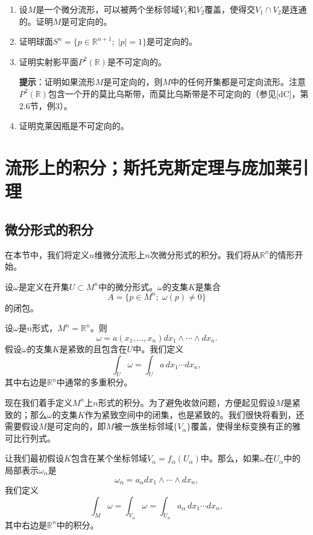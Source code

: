 \documentclass[12pt,a4paper]{ctexbook}
\begin{document}
\begin{enumerate}
    \item 设$M$是一个微分流形，可以被两个坐标邻域$V_1$和$V_2$覆盖，使得交$V_1\cap V_2$是连通的。证明$M$是可定向的。
    
    \item 证明球面$S^n = \{p\in\mathbb{R}^{n+1};\; |p|=1\}$是可定向的。
    
    \item 证明实射影平面$P^2(\mathbb{R})$是不可定向的。
    
    \textbf{提示}：证明如果流形$M$是可定向的，则$M$中的任何开集都是可定向流形。注意$P^2(\mathbb{R})$包含一个开的莫比乌斯带，而莫比乌斯带是不可定向的（参见[dC]，第2.6节，例3）。
    
    \item 证明克莱因瓶是不可定向的。
\end{enumerate}

\chapter{流形上的积分；斯托克斯定理与庞加莱引理}

\section{微分形式的积分}

在本节中，我们将定义$n$维微分流形上$n$次微分形式的积分。我们将从$\mathbb{R}^n$的情形开始。

设$\omega$是定义在开集$U\subset M^n$中的微分形式。$\omega$的支集$K$是集合
$$A = \{p\in M^n;\; \omega(p)\neq 0\}$$
的闭包。

设$\omega$是$n$形式，$M^n=\mathbb{R}^n$。则
$$\omega = a(x_1,\ldots,x_n)dx_1\wedge\cdots\wedge dx_n.$$
假设$\omega$的支集$K$是紧致的且包含在$U$中。我们定义
$$\int_U \omega = \int_U a\,dx_1\cdots dx_n,$$
其中右边是$\mathbb{R}^n$中通常的多重积分。

现在我们着手定义$M^n$上$n$形式的积分。为了避免收敛问题，方便起见假设$M$是紧致的；那么$\omega$的支集$K$作为紧致空间中的闭集，也是紧致的。我们很快将看到，还需要假设$M$是可定向的，即$M$被一族坐标邻域$\{V_\alpha\}$覆盖，使得坐标变换有正的雅可比行列式。

让我们最初假设$K$包含在某个坐标邻域$V_\alpha = f_\alpha(U_\alpha)$中。那么，如果$\omega$在$U_\alpha$中的局部表示$\omega_\alpha$是
$$\omega_\alpha = a_\alpha dx_1\wedge\cdots\wedge dx_n,$$
我们定义
$$\int_M \omega = \int_{V_\alpha} \omega = \int_{U_\alpha} a_\alpha\,dx_1\cdots dx_n,$$
其中右边是$\mathbb{R}^n$中的积分。
\end{document}
